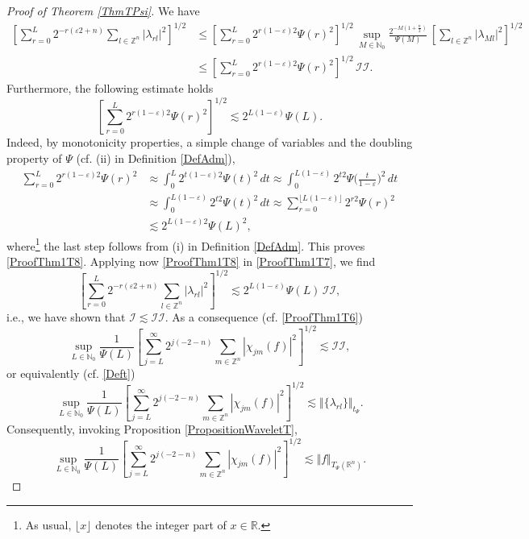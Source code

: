 \documentclass[11pt, a4paper,leqno]{amsart}
\theoremstyle{plain}
\numberwithin{equation}{section}
\theoremstyle{definition}
\theoremstyle{remark}
\def\R{\mathbb{R}}
\begin{document}
\begin{proof}[Proof of Theorem \ref{ThmTPsi}]
We have
\begin{align}
\left[  \sum_{r=0}^{L}2^{-r(\varepsilon2+n)}\sum_{l\in\mathbb{Z}^{n}}%
|\lambda_{rl}|^{2}\right]  ^{1/2}  &  \leq\left[  \sum_{r=0}^{L}%
2^{r(1-\varepsilon)2}\Psi(r)^{2}\right]  ^{1/2}\,\sup_{M\in\mathbb{N}_{0}%
}\frac{2^{-M(1+\frac{n}{2})}}{\Psi(M)}\,\left[\sum_{l\in\mathbb{Z}^{n}%
}|\lambda_{Ml}|^{2}\right]^{1/2}\nonumber\\
&  \leq\left[  \sum_{r=0}^{L}2^{r(1-\varepsilon)2}\Psi(r)^{2}\right]
^{1/2}\,\mathcal{II}. \label{ProofThm1T7}%
\end{align}
Furthermore, the following estimate holds
\begin{equation}
\left[  \sum_{r=0}^{L}2^{r(1-\varepsilon)2}\Psi(r)^{2}\right]  ^{1/2}%
\lesssim2^{L(1-\varepsilon)}\Psi(L). \label{ProofThm1T8}%
\end{equation}
Indeed, by monotonicity properties, a simple change of variables and the
doubling property of $\Psi$ (cf. (ii) in Definition \ref{DefAdm}),
\begin{align*}
\sum_{r=0}^{L}2^{r(1-\varepsilon)2}\Psi(r)^{2}  &  \approx\int_{0}%
^{L}2^{t(1-\varepsilon)2}\Psi(t)^{2}\,dt  \approx\int_{0}^{L(1-\varepsilon)}2^{t2}\Psi\bigg(\frac{t}{1-\varepsilon
}\bigg)^{2}\,dt\\
&  \approx\int_{0}^{L(1-\varepsilon)}2^{t2}\Psi(t)^{2}\,dt  \approx\sum_{r=0}^{\lfloor L(1-\varepsilon)\rfloor}2^{r2}\Psi(r)^{2}\\
&  \lesssim2^{L(1-\varepsilon)2}\Psi(L)^{2},
\end{align*}
where\footnote{As usual, $\lfloor x \rfloor$ denotes the integer part of $x \in \R$.} the last step follows from (i) in Definition \ref{DefAdm}. This proves \eqref{ProofThm1T8}.
Applying now \eqref{ProofThm1T8} in \eqref{ProofThm1T7}, we find
\[
\left[  \sum_{r=0}^{L}2^{-r(\varepsilon2+n)}\sum_{l\in\mathbb{Z}^{n}}%
|\lambda_{rl}|^{2}\right]  ^{1/2}\lesssim2^{L(1-\varepsilon)}\Psi
(L)\,\mathcal{II},
\]
i.e., we have shown that $\mathcal{I}\lesssim\mathcal{II}$. As a consequence
(cf. \eqref{ProofThm1T6})
\[
\sup_{L\in\mathbb{N}_{0}}\frac{1}{\Psi(L)}\left[  \sum_{j=L}^{\infty
}2^{j(-2-n)}\sum_{m\in\mathbb{Z}^{n}}|\chi_{jm}(f)|^{2}\right]  ^{1/2}%
\lesssim\mathcal{II},
\]
or equivalently (cf. \eqref{Deft})
\[
\sup_{L\in\mathbb{N}_{0}}\frac{1}{\Psi(L)}\left[  \sum_{j=L}^{\infty
}2^{j(-2-n)}\sum_{m\in\mathbb{Z}^{n}}|\chi_{jm}(f)|^{2}\right]  ^{1/2}%
\lesssim\Vert\{\lambda_{rl}\}\Vert_{t_{\Psi}}.
\]
Consequently, invoking Proposition \ref{PropositionWaveletT},%
\begin{equation}
\sup_{L\in\mathbb{N}_{0}}\frac{1}{\Psi(L)}\left[  \sum_{j=L}^{\infty
}2^{j(-2-n)}\sum_{m\in\mathbb{Z}^{n}}|\chi_{jm}(f)|^{2}\right]  ^{1/2}%
\lesssim\Vert f\Vert_{T_{\Psi}(\mathbb{R}^{n})}. \label{ProofThm1T9}%
\end{equation}



\end{proof}
\end{document}
